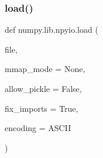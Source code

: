 \subsubsection{\texorpdfstring{load()}{load()}}
{\footnotesize\ttfamily def numpy.\+lib.\+npyio.\+load (\begin{DoxyParamCaption}\item[{}]{file,  }\item[{}]{mmap\+\_\+mode = {\ttfamily None},  }\item[{}]{allow\+\_\+pickle = {\ttfamily False},  }\item[{}]{fix\+\_\+imports = {\ttfamily True},  }\item[{}]{encoding = {\ttfamily \textquotesingle{}ASCII\textquotesingle{}} }\end{DoxyParamCaption})}

